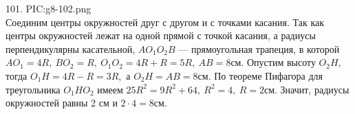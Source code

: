 101. {{PIC:g8-102.png}}\\
Соединим центры окружностей друг с другом и с точками касания. Так как центры окружностей лежат на одной прямой с точкой касания, а радиусы перпендикулярны касательной, $AO_1O_2B$ --- прямоугольная трапеция, в которой $AO_1=4R,\ BO_2=R,\ O_1O_2=4R+R=5R,\ AB=8$см. Опустим высоту $O_2H,$ тогда $O_1H=4R-R=3R,$ а $O_2H=AB=8$см. По теореме Пифагора для треугольника $O_1HO_2$ имеем $25R^2=9R^2+64,\ R^2=4,\ R=2$см. Значит, радиусы окружностей равны 2 см и $2\cdot4=8$см.\\
